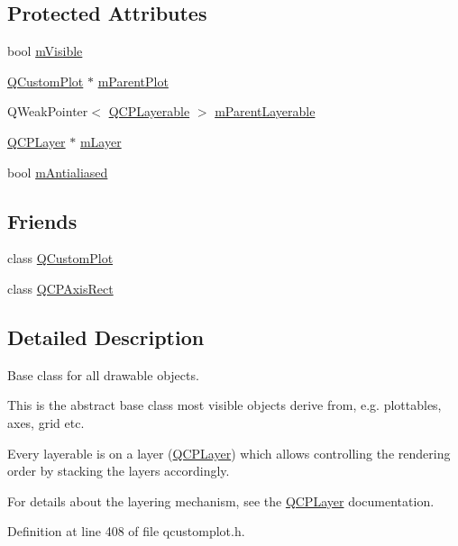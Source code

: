 \subsection*{Protected Attributes}
\begin{DoxyCompactItemize}
\item 
bool \hyperlink{class_q_c_p_layerable_a62e3aed8427d6ce3ccf716f285106cb3}{m\-Visible}
\item 
\hyperlink{class_q_custom_plot}{Q\-Custom\-Plot} $\ast$ \hyperlink{class_q_c_p_layerable_aa2a528433e44db02b8aef23c1f9f90ed}{m\-Parent\-Plot}
\item 
Q\-Weak\-Pointer$<$ \hyperlink{class_q_c_p_layerable}{Q\-C\-P\-Layerable} $>$ \hyperlink{class_q_c_p_layerable_a17dbb64129b2c3a37c79378b619ebce4}{m\-Parent\-Layerable}
\item 
\hyperlink{class_q_c_p_layer}{Q\-C\-P\-Layer} $\ast$ \hyperlink{class_q_c_p_layerable_aa38ec5891aff0f50b36fd63e9372a0cd}{m\-Layer}
\item 
bool \hyperlink{class_q_c_p_layerable_a3ab45a4c76a3333ce42eb217a81733ec}{m\-Antialiased}
\end{DoxyCompactItemize}
\subsection*{Friends}
\begin{DoxyCompactItemize}
\item 
class \hyperlink{class_q_c_p_layerable_a1cdf9df76adcfae45261690aa0ca2198}{Q\-Custom\-Plot}
\item 
class \hyperlink{class_q_c_p_layerable_acbf20ecb140f66c5fd1bc64ae0762990}{Q\-C\-P\-Axis\-Rect}
\end{DoxyCompactItemize}


\subsection{Detailed Description}
Base class for all drawable objects. 

This is the abstract base class most visible objects derive from, e.\-g. plottables, axes, grid etc.

Every layerable is on a layer (\hyperlink{class_q_c_p_layer}{Q\-C\-P\-Layer}) which allows controlling the rendering order by stacking the layers accordingly.

For details about the layering mechanism, see the \hyperlink{class_q_c_p_layer}{Q\-C\-P\-Layer} documentation. 

Definition at line 408 of file qcustomplot.\-h.



